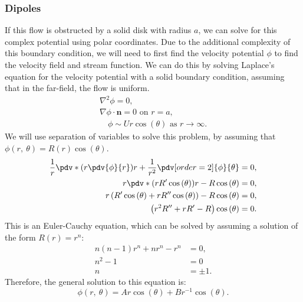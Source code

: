 \documentclass{article}
\theoremstyle{definition}
\begin{document}
\subsubsection{Dipoles}
If this flow is obstructed by a solid disk with radius \(a\), we can
solve for this complex potential using polar coordinates. Due to the
additional complexity of this boundary condition, we will need to first
find the velocity potential \(\phi\) to find the velocity field and
stream function. We can do this by solving Laplace's equation for the
velocity potential with a solid boundary condition, assuming that in
the far-field, the flow is uniform.
\begin{gather*}
    \nabla^2 \phi = 0, \\
    \nabla \phi \cdot \symbf{n} = 0 \text{ on } r = a, \\
    \quad \phi \sim U r \cos{\left( \theta \right)} \text{ as } r \to \infty.
\end{gather*}
We will use separation of variables to solve this problem, by assuming
that \(\phi\left( r,\: \theta \right) = R\left( r \right) \cos{\left( \theta \right)}\).
\begin{align*}
    \frac{1}{r} \pdv*{\left( r \pdv{\phi}{r} \right)}{r} + \frac{1}{r^2} \pdv[order=2]{\phi}{\theta}                    & = 0, \\
    r \pdv*{\left( r R' \cos{\left( \theta \right)} \right)}{r} - R \cos{\left( \theta \right)}                         & = 0, \\
    r \left( R' \cos{\left( \theta \right)} + r R'' \cos{\left( \theta \right)} \right) - R \cos{\left( \theta \right)} & = 0, \\
    \left( r^2 R'' + r R' - R \right) \cos{\left( \theta \right)}                                                       & = 0.
\end{align*}
This is an Euler-Cauchy equation, which can be solved by assuming a
solution of the form \(R\left( r \right) = r^n\):
\begin{align*}
    n \left( n - 1 \right) r^n + n r^n - r^n & = 0,     \\
    n^2 - 1                                  & = 0      \\
    n                                        & = \pm 1.
\end{align*}
Therefore, the general solution to this equation is:
\begin{equation*}
    \phi\left( r,\: \theta \right) = A r \cos{\left( \theta \right)} + B r^{-1} \cos{\left( \theta \right)}.
\end{equation*}
\end{document}
